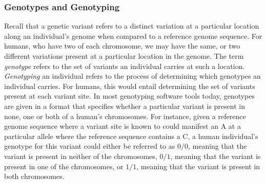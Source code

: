 \subsubsection{Genotypes and Genotyping} \label{background:biology:genotype_and_genotyping}
Recall that a genetic variant refers to a distinct variation at a particular location along an individual's genome when compared to a reference genome sequence.
For humans, who have two of each chromosome, we may have the same, or two different variations present at a particular location in the genome.
The term \textit{genotype} refers to the set of variants an individual carries at such a location.
\textit{Genotyping} an individual refers to the process of determining which genotypes an individual carries. 
For humans, this would entail determining the set of variants present at each variant site.
In most genotyping software tools today, genotypes are given in a format that specifies whether a particular variant is present in none, one or both of a human's chromosomes.
For instance, given a reference genome sequence where a variant site is known to could manifest an A at a particular allele where the reference sequence contains a C, a human individual's genotype for this variant could either be referred to as $0/0$, meaning that the variant is present in neither of the chromosomes, $0/1$, meaning that the variant is present in one of the chromosomes, or $1/1$, meaning that the variant is present in both chromosomes.


